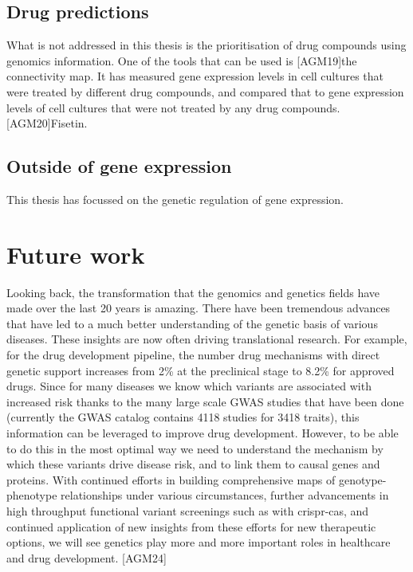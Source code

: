 \subsection{Drug predictions}
What is not addressed in this thesis is the prioritisation of drug compounds using genomics information. One of the tools that can be used is [AGM19]the connectivity map\cite{lambConnectivityMapUsing2006}. It has measured gene expression levels in cell cultures that were treated by different drug compounds, and compared that to gene expression levels of cell cultures that were not treated by any drug compounds. [AGM20]Fisetin\cite{gibbsHumanGenomeProject2020}.

\subsection{Outside of gene expression}
This thesis has focussed on the genetic regulation of gene expression. 

\section{Future work}
Looking back, the transformation that the genomics and genetics fields have made over the last 20 years is amazing. There have been tremendous advances that have led to a much better understanding of the genetic basis of various diseases. These insights are now often driving translational research. For example, for the drug development pipeline, the number drug mechanisms with direct genetic support increases from 2\% at the preclinical stage to 8.2\% for approved drugs\cite{nelsonSupportHumanGenetic2015d}. Since for many diseases we know which variants are associated with increased risk thanks to the many large scale GWAS studies that have been done (currently the GWAS catalog\cite{macarthurNewNHGRIEBICatalog2017a} contains 4118 studies for 3418 traits), this information can be leveraged to improve drug development. However, to be able to do this in the most optimal way we need to understand the mechanism by which these variants drive disease risk, and to link them to causal genes and proteins.
With continued efforts in building comprehensive maps of genotype-phenotype relationships under various circumstances, further advancements in high throughput functional variant screenings such as with crispr-cas, and continued application of new insights from these efforts for new therapeutic options, we will see genetics play more and more important roles in healthcare and drug development. [AGM24]

